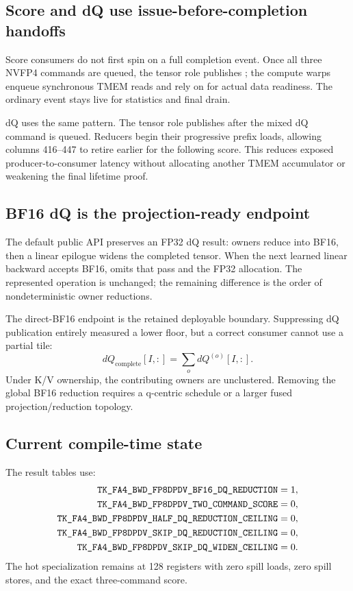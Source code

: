 \subsection{Score and dQ use issue-before-completion handoffs}

Score consumers do not first spin on a full completion event.  Once all three
NVFP4 commands are queued, the tensor role publishes ;
the compute warps enqueue synchronous TMEM reads and rely on
 for actual data readiness.  The ordinary
 event stays live for statistics and final drain.

dQ uses the same pattern.  The tensor role publishes  after
the mixed dQ command is queued.  Reducers begin their progressive prefix
loads, allowing columns 416--447 to retire earlier for the following score.
This reduces exposed producer-to-consumer latency without allocating another
TMEM accumulator or weakening the final lifetime proof.

\subsection{BF16 dQ is the projection-ready endpoint}

The default public API preserves an FP32 dQ result: owners reduce into BF16,
then a linear epilogue widens the completed tensor.  When the next learned
linear backward accepts BF16,  omits that pass and
the FP32 allocation.  The represented operation is unchanged; the remaining
difference is the order of nondeterministic owner reductions.

The direct-BF16 endpoint is the retained deployable boundary.  Suppressing dQ
publication entirely measured a lower floor, but a correct consumer cannot
use a partial tile:
\begin{equation}
  dQ_{\mathrm{complete}}[I,:]
  =\sum_o dQ^{(o)}[I,:].
  \label{eq:complete-dq-tile}
\end{equation}
Under K/V ownership, the contributing owners are unclustered.  Removing the
global BF16 reduction requires a q-centric schedule or a larger fused
projection/reduction topology.

\subsection{Current compile-time state}

The result tables use:
\begin{align*}
  \texttt{TK\_FA4\_BWD\_FP8DPDV\_BF16\_DQ\_REDUCTION} &= 1,\\
  \texttt{TK\_FA4\_BWD\_FP8DPDV\_TWO\_COMMAND\_SCORE} &= 0,\\
  \texttt{TK\_FA4\_BWD\_FP8DPDV\_HALF\_DQ\_REDUCTION\_CEILING} &= 0,\\
  \texttt{TK\_FA4\_BWD\_FP8DPDV\_SKIP\_DQ\_REDUCTION\_CEILING} &= 0,\\
  \texttt{TK\_FA4\_BWD\_FP8DPDV\_SKIP\_DQ\_WIDEN\_CEILING} &= 0.
\end{align*}
The hot specialization remains at 128 registers with zero spill loads,
zero spill stores, and the exact three-command score.
